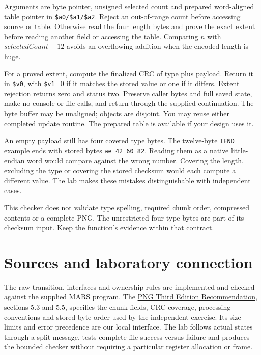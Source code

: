 

Arguments are byte pointer, unsigned selected count and prepared word-aligned table
pointer in \texttt{\$a0/\$a1/\$a2}. Reject an out-of-range count before accessing
source or table. Otherwise read the four length bytes and prove the exact extent
before reading another field or accessing the table. Comparing $n$ with
$\mathit{selectedCount}-12$ avoids an overflowing addition when the encoded length is huge.

For a proved extent, compute the finalized CRC of type plus payload. Return it
in \texttt{\$v0}, with \texttt{\$v1}=0 if it matches the stored value or one
if it differs. Extent rejection returns zero and status two. Preserve caller
bytes and full saved state, make no console or file calls, and return through
the supplied continuation. The byte buffer may be unaligned; objects are disjoint.
You may reuse either completed update routine. The prepared table is available
if your design uses it.

An empty payload still has four covered type bytes. The twelve-byte \texttt{IEND}
example ends with stored bytes \texttt{ae 42 60 82}. Reading them as a native
little-endian word would compare against the wrong number. Covering the length,
excluding the type or covering the stored checksum would each compute a different
value. The lab makes these mistakes distinguishable with independent cases.

This checker does not validate type spelling, required chunk order, compressed
contents or a complete PNG. The unrestricted four type bytes are part of its
checksum input. Keep the function's evidence within that contract.

\section*{Sources and laboratory connection}
The raw transition, interfaces and ownership rules are implemented and checked
against the supplied MARS program. The
\href{https://www.w3.org/TR/2025/REC-png-3-20250624/}{PNG Third Edition Recommendation},
sections 5.3 and 5.5, specifies the chunk fields, CRC coverage, processing conventions
and stored byte order used by the independent exercise. Its size limits and error
precedence are our local interface. The lab follows actual states through a split
message, tests complete-file success versus failure and produces the bounded
checker without requiring a particular register allocation or frame.
